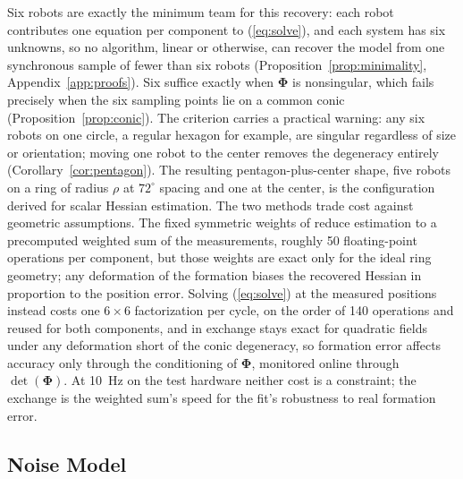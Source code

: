 \documentclass[lettersize,journal]{IEEEtran}
\begin{document}
Six robots are exactly the minimum team for this recovery: each robot
contributes one equation per component to (\ref{eq:solve}), and each
system has six unknowns, so no algorithm, linear or otherwise, can
recover the model from one synchronous sample of fewer than six robots
(Proposition~\ref{prop:minimality}, Appendix~\ref{app:proofs}). Six
suffice exactly when $\boldsymbol{\Phi}$ is nonsingular, which fails
precisely when the six sampling points lie on a common conic
(Proposition~\ref{prop:conic}). The criterion carries a practical
warning: any six robots on one circle, a regular hexagon for example,
are singular regardless of size or orientation; moving one robot to the
center removes the degeneracy entirely (Corollary~\ref{cor:pentagon}).
The resulting pentagon-plus-center shape, five robots on a ring of
radius $\rho$ at $72^\circ$ spacing and one at the center, is the
configuration \cite{15} derived for scalar Hessian estimation. The two
methods trade cost against geometric assumptions. The fixed symmetric
weights of \cite{15} reduce estimation to a precomputed weighted sum of
the measurements, roughly 50 floating-point operations per component,
but those weights are exact only for the ideal ring geometry; any
deformation of the formation biases the recovered Hessian in proportion
to the position error. Solving (\ref{eq:solve}) at the measured
positions instead costs one $6 \times 6$ factorization per cycle, on the
order of 140 operations and reused for both components, and in exchange
stays exact for quadratic fields under any deformation short of the
conic degeneracy, so formation error affects accuracy only through the
conditioning of $\boldsymbol{\Phi}$, monitored online through
$\det(\boldsymbol{\Phi})$. At 10~Hz on the test hardware neither cost is
a constraint; the exchange is the weighted sum's speed for the fit's
robustness to real formation error.

\subsection{Noise Model}
\label{sec:noise_model}
\end{document}
